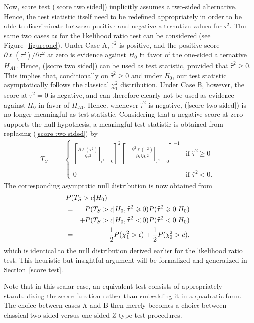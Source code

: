 \documentclass[useAMS,usenatbib,referee]{biom}
\begin{document}
Now, score test (\ref{score two sided}) implicitly assumes a two-sided
alternative.  Hence, the test statistic itself need to be redefined
appropriately in order to be able to discriminate between positive and
negative alternative values for $\tau^2$. The same two cases as for
the likelihood ratio test can be considered (see
Figure~\ref{figureone}).  Under Case A, $\widehat\tau^2$ is positive,
and the positive score $\partial \ell(\tau^2)/\partial \tau^2$ at zero
is evidence against $H_0$ in favor of the one-sided alternative
$H_{A1}$. Hence, (\ref{score two sided}) can be used as test
statistic, provided that $\widehat\tau^2 \geq 0$. This implies that,
conditionally on $\widehat\tau^2 \geq 0$ and under $H_0$, our test
statistic asymptotically follows the classical $\chi^2_1$
distribution.  Under Case B, however, the score at $\tau^2=0$ is
negative, and can therefore clearly not be used as evidence against
$H_0$ in favor of $H_{A1}$. Hence, whenever $\widehat\tau^2$ is
negative, (\ref{score two sided}) is no longer meaningful as test
statistic. Considering that a negative score at zero supports the null
hypothesis, a meaningful test statistic is obtained from replacing
(\ref{score two sided}) by
\begin{eqnarray}
T_S & = & \left\{\begin{array}{ll}\left[\left.\frac{\partial \ell(\tau^2)}{\partial \tau^2}\right|_{\tau^2=0}\right]^2 \left[\left. - \frac{\partial^2 \ell(\tau^2)}{\partial \tau^2 \partial \tau^2}\right|_{\tau^2=0}\right]^{-1} & \mbox{if }\widehat\tau^2 \geq 0\\  \\
0 & \mbox{if }\widehat\tau^2 < 0.
\end{array}\right.
\label{score one sided}
\end{eqnarray}
The corresponding asymptotic null distribution is now obtained from
\begin{eqnarray*}
\lefteqn{P(T_{S}> c|H_0)}\\ 
& = &
P(T_{S}> c|H_0,\widehat\tau^2\ge 0)P(\widehat\tau^2\ge 0|H_0)\\
&&+
P(T_{S}> c|H_0,\widehat\tau^2< 0)P(\widehat\tau^2< 0|H_0) \\ 
& = & \frac{1}{2} P(\chi^2_1>c) + \frac{1}{2} P(\chi_0^2 > c),
\end{eqnarray*}
which is identical to the null distribution derived earlier for the
likelihood ratio test. This heuristic but insightful argument will be
formalized and generalized in Section~\ref{score test}.

Note that in this scalar case, an equivalent test consists of
appropriately standardizing the score function rather than embedding
it in a quadratic form. The choice between cases A and B then merely
becomes a choice between classical two-sided versus one-sided $Z$-type
test procedures.
\end{document}
